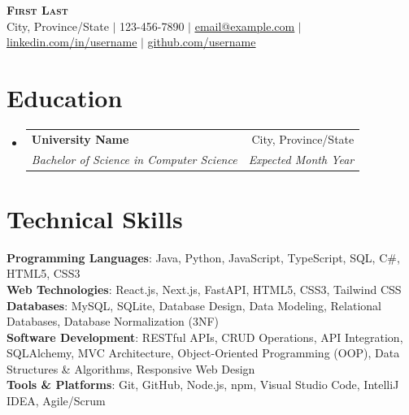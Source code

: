 \documentclass[letterpaper,11pt]{article}
\makeatletter
\newcommand{\resumeSubheading}[4]{
  \vspace{-2pt}\item
    \begin{tabular*}{0.97\textwidth}[t]{l@{\extracolsep{\fill}}r}
      \textbf{#1} & #2 \\
      \textit{\small#3} & \textit{\small #4} \\
    \end{tabular*}\vspace{-7pt}
}
\newcommand{\resumeSubHeadingListStart}{\begin{itemize}[leftmargin=0.15in, label={}]}
\newcommand{\resumeSubHeadingListEnd}{\end{itemize}}
\makeatother
\begin{document}
\begin{center}
    \textbf{\Huge \scshape First Last} \\ \vspace{1pt}
    \small City, Province/State $|$ 123-456-7890 $|$
    \href{mailto:email@example.com}{\underline{email@example.com}} $|$
    \href{https://linkedin.com/in/username}{\underline{linkedin.com/in/username}} $|$
    \href{https://github.com/username}{\underline{github.com/username}}
\end{center}

\section{Education}
  \resumeSubHeadingListStart
    \resumeSubheading
      {University Name}{City, Province/State}
      {Bachelor of Science in Computer Science}{Expected Month Year}
  \resumeSubHeadingListEnd

\section{Technical Skills}
 \begin{itemize}[leftmargin=0.15in, label={}]
    \small{\item{
     \textbf{Programming Languages}{: Java, Python, JavaScript, TypeScript, SQL, C\#, HTML5, CSS3} \\
     \textbf{Web Technologies}{: React.js, Next.js, FastAPI, HTML5, CSS3, Tailwind CSS} \\
     \textbf{Databases}{: MySQL, SQLite, Database Design, Data Modeling, Relational Databases, Database Normalization (3NF)} \\
     \textbf{Software Development}{: RESTful APIs, CRUD Operations, API Integration, SQLAlchemy, MVC Architecture, Object-Oriented Programming (OOP), Data Structures \& Algorithms, Responsive Web Design} \\
     \textbf{Tools \& Platforms}{: Git, GitHub, Node.js, npm, Visual Studio Code, IntelliJ IDEA, Agile/Scrum}
    }}
 \end{itemize}

\end{document}
